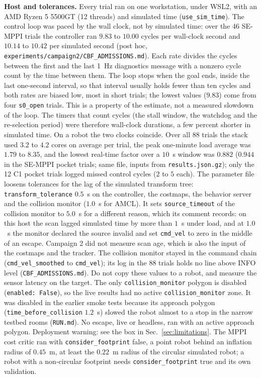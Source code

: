 \documentclass[journal]{IEEEtran}
\begin{document}
\textbf{Host and tolerances.} Every trial ran on one workstation, under WSL2, with an AMD
Ryzen 5 5500GT (12 threads) and simulated time (\texttt{use\_sim\_time}). The control loop was
paced by the wall clock, not by simulated time: over the 46 SE-MPPI trials the controller ran $9.83$
to $10.00$ cycles per wall-clock second and $10.14$ to $10.42$ per simulated second (post hoc,
\texttt{experiments/campaign2/}\allowbreak\texttt{CBF\_ADMISSIONS.md}). Each rate divides the cycles between the first and the last 1~Hz diagnostics message with a nonzero cycle
count by the time between them. The loop stops when the goal ends, inside the last one-second interval, so that
interval usually holds fewer than ten cycles and both rates are biased low, most in short trials; the lowest
values ($9.83$) come from four \texttt{s0\_open} trials. This is a property of the estimate, not a measured
slowdown of the loop. The timers that count cycles (the stall window, the watchdog and the
re-selection period) were therefore wall-clock durations, a few percent
shorter in simulated time. On a robot the two clocks coincide. Over all 88 trials the stack used
$3.2$ to $4.2$ cores on average per trial, the peak one-minute load average was $1.79$ to $8.35$,
and the lowest real-time factor over a $10$~s window was $0.882$ ($0.944$ in the SE-MPPI pocket
trials; same file, inputs from \texttt{results.json.gz}); only the 12 C1 pocket trials logged missed control cycles ($2$ to $5$ each). The parameter
file loosens tolerances for the lag of the simulated transform tree: \texttt{transform\_tolerance}
$0.5$~s on the controller, the costmaps, the behavior server and the collision monitor ($1.0$~s
for AMCL). It sets \texttt{source\_timeout} of the collision monitor to $5.0$~s for a different
reason, which its comment records: on this host the scan lagged simulated time by more than $1$~s
under load, and at $1.0$~s the monitor declared the source invalid and set \texttt{cmd\_vel} to zero
in the middle of an escape. Campaign 2 did not measure scan age, which is also the input of the
costmaps and the tracker. The collision monitor stayed in the command chain
(\texttt{cmd\_vel\_smoothed} to \texttt{cmd\_vel}); its log in the 88 trials holds no line above
INFO level (\texttt{CBF\_ADMISSIONS.md}). Do not copy these values to a robot, and measure the
sensor latency on the target. The only \texttt{collision\_monitor} polygon is disabled
(\texttt{enabled: False}), so the live results had no active \texttt{collision\_monitor}
zone. It was disabled in the earlier smoke tests because its approach polygon
(\texttt{time\_before\_collision} $1.2$~s) slowed the robot almost to a stop in the narrow
testbed rooms (\texttt{RUN.md}). No escape, live or headless, ran with an active approach
polygon. Deployment warning: see the box in Sec.~\ref{sec:limitations}. The MPPI cost critic ran with
\texttt{consider\_footprint} false, a point robot behind an inflation radius of $0.45$~m, at
least the $0.22$~m radius of the circular simulated robot; a robot with a non-circular
footprint needs \texttt{consider\_footprint} true and its own validation.
\end{document}
